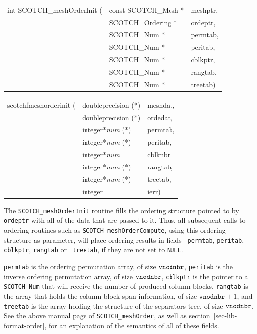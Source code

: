 \begin{itemize}
\progsyn

{\tt\begin{tabular}{l@{}ll}
int SCOTCH\_meshOrderInit ( & const SCOTCH\_Mesh * & meshptr, \\
                            & SCOTCH\_Ordering *   & ordeptr, \\
                            & SCOTCH\_Num *        & permtab, \\
                            & SCOTCH\_Num *        & peritab, \\
                            & SCOTCH\_Num *        & cblkptr, \\
                            & SCOTCH\_Num *        & rangtab, \\
                            & SCOTCH\_Num *        & treetab)
\end{tabular}}

{\tt\begin{tabular}{l@{}ll}
scotchfmeshorderinit ( & doubleprecision (*)   & meshdat, \\
                       & doubleprecision (*)   & ordedat, \\
                       & integer*{\it num} (*) & permtab, \\
                       & integer*{\it num} (*) & peritab, \\
                       & integer*{\it num}     & cblknbr, \\
                       & integer*{\it num} (*) & rangtab, \\
                       & integer*{\it num} (*) & treetab, \\
                       & integer               & ierr)
\end{tabular}}

\progdes

The {\tt SCOTCH\_mesh\lbt Order\lbt Init} routine fills the ordering
structure pointed to by {\tt ordeptr} with all of the data that are
passed to it. Thus, all subsequent calls to ordering routines such as
{\tt SCOTCH\_\lbt mesh\lbt Order\lbt Compute}, using this ordering
structure as parameter, will place ordering results in fields {\tt
permtab}, {\tt peritab}, {\tt *cblkptr}, {\tt rangtab} or {\tt
treetab}, if they are not set to {\tt NULL}.

{\tt permtab} is the ordering permutation array, of size ${\tt
vnodnbr}$, {\tt peritab} is the inverse ordering permutation array,
of size ${\tt vnodnbr}$, {\tt cblkptr} is the pointer to a
{\tt SCOTCH\_\lbt Num} that will receive the number of produced
column blocks, {\tt rangtab} is the array that holds the column block
span information, of size $\mathtt{vnodnbr} + 1$, and {\tt treetab}
is the array holding the structure of the separators tree, of size
${\tt vnodnbr}$. See the above manual page of
{\tt SCOTCH\_mesh\lbt Order}, as well as
section~\ref{sec-lib-format-order}, for an explanation of the
semantics of all of these fields.


\end{itemize}
